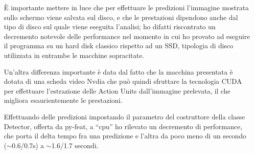 È importante mettere in luce che per effettuare le predizioni l’immagine mostrata sullo schermo viene salvata sul disco, e che le prestazioni dipendono anche dal tipo di disco sul quale viene eseguita l’analisi; ho difatti riscontrato un decremento notevole delle performance nel momento in cui ho provato ad eseguire il programma su un hard disk classico rispetto ad un SSD, tipologia di disco utilizzata in entrambe le macchine sopracitate.

Un’altra differenza importante è data dal fatto che la macchina presentata è dotata di una scheda video Nvdia che può quindi sfruttare la tecnologia CUDA per effettuare l’estrazione delle Action Units dall’immagine prelevata, il che migliora esaurientemente le prestazioni.

Effettuando delle predizioni impostando il parametro del costruttore della classe Detector, offerta da py-feat, a “cpu” ho rilevato un decremento di performance, che porta il delta tempo fra una predizione e l’altra da poco meno di un secondo ($\sim$0.6/0.7s) a $\sim$1.6/1.7 secondi.
